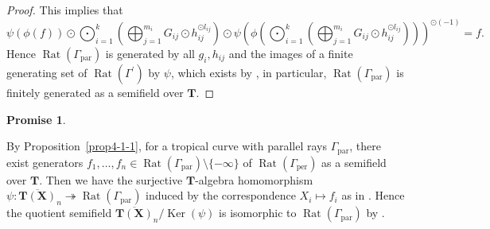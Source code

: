 \documentclass[a4paper,12pt]{amsart}
\newtheorem{prom}[dfn]{Promise}
\def\Gamma{\varGamma}
\begin{document}
\begin{proof}
This implies that
\begin{equation}
\label{prop4-1-1:eq1}
\psi(\phi(f)) \odot \bigodot_{i = 1}^k  \left( \bigoplus_{j = 1}^{m_i} G_{ij} \odot h_{ij}^{\odot l_{ij}} \right) \odot \psi \left( \phi \left( \bigodot_{i = 1}^k  \left( \bigoplus_{j = 1}^{m_i} G_{ij} \odot h_{ij}^{\odot l_{ij}} \right) \right) \right)^{\odot (-1)} = f.
\end{equation}
Hence $\operatorname{Rat}(\Gamma_{\operatorname{par}})$ is generated by all $g_i, h_{ij}$ and the images of a finite generating set of $\operatorname{Rat}(\Gamma^{\prime})$ by $\psi$, which exists by \cite[Proposition~3.6]{JuAe3}, in particular, $\operatorname{Rat}(\Gamma_{\operatorname{par}})$ is finitely generated as a semifield over $\boldsymbol{T}$.
\end{proof}

\begin{prom}
    \label{prom4-1-1}
\end{prom}

By Proposition~\ref{prop4-1-1}, for a tropical curve with parallel rays $\Gamma_{\operatorname{par}}$, there exist generators $f_1, \ldots, f_n \in \operatorname{Rat}(\Gamma_{\operatorname{par}}) \setminus \{ -\infty \}$ of $\operatorname{Rat}(\Gamma_{\operatorname{per}})$ as a semifield over $\boldsymbol{T}$.
Then we have the surjective $\boldsymbol{T}$-algebra homomorphism $\psi : \overline{\boldsymbol{T}(\boldsymbol{X})}_n \twoheadrightarrow \operatorname{Rat}(\Gamma_{\operatorname{par}})$ induced by the correspondence $X_i \mapsto f_i$ as in \cite[the proof of Lemma~3.10]{JuAe4}.
Hence the quotient semifield $\overline{\boldsymbol{T}(\boldsymbol{X})}_n / \operatorname{Ker}(\psi)$ is isomorphic to $\operatorname{Rat}(\Gamma_{\operatorname{par}})$ by \cite[Proposition~2.4.4]{Giansiracusa=Giansiracusa}.
\end{document}
